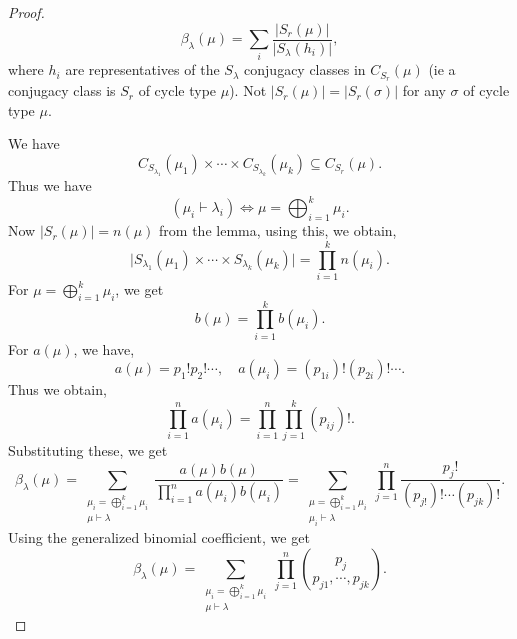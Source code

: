 \documentclass[10pt]{article}
\numberwithin{equation}{theorem}
\begin{document}
\begin{proof}
  \begin{equation*}
    \beta_{\lambda}(\mu) = \sum_{i} {\frac {\vert S_r(\mu)\vert} {\vert S_\lambda(h_i)
    \vert}},
  \end{equation*}
  where $h_i$ are representatives of the $S_\lambda$ conjugacy classes in $C_{S_r}(\mu)$ (ie a conjugacy class is $S_r$ of cycle type $\mu$). Not $\vert S_r(\mu)\vert = \vert S_r(\sigma)\vert $ for any $\sigma $ of cycle type $\mu$.
  \par We have
  \begin{equation*}
    C_{S_{\lambda_1}}(\mu_1)\times \cdots\times C_{S_{\lambda_k}}(\mu_k)\subseteq C_{S_r}(\mu).
  \end{equation*}
  Thus we have 
  \begin{equation*}
    (\mu_i\vdash \lambda_i)\Leftrightarrow \mu = \bigoplus_{i=1}^k \mu_i. 
  \end{equation*}
  Now $\vert S_r(\mu)\vert = n(\mu)$ from the lemma, using this, we obtain,
  \begin{equation*}
    \vert S_{\lambda_1}(\mu_1)\times \cdots\times S_{\lambda_k}(\mu_k)\vert  = \prod_{i=1}^k n(\mu_i).
  \end{equation*}
  For $\mu = \bigoplus_{i=1}^k\mu_i$, we get 
  \begin{equation*}
    b(\mu) = \prod_{i=1}^k b(\mu_i).
  \end{equation*}
  For $a(\mu)$, we have,
  \begin{equation*}
    a(\mu) = p_1!p_2!\cdots, \quad a(\mu_i) = (p_{1i})!(p_{2i})!\cdots.
  \end{equation*}
  Thus we obtain,
  \begin{equation*}
    \prod_{i=1}^n a(\mu_i) = \prod_{i=1}^n\prod_{j=1}^k (p_{ij})!.
  \end{equation*}
  Substituting these, we get 
  \begin{equation*}
    \beta_\lambda(\mu) = \sum_{\substack{\mu_i=\bigoplus_{i=1}^k \mu_i\\ \mu\vdash \lambda}} {\frac {a(\mu)b(\mu)} {\prod_{i=1}^na(\mu_i)b(\mu_i)}} = \sum_{\substack{\mu = \bigoplus_{i=1}^k \mu_i\\ \mu_i\vdash \lambda}}\prod_{j=1}^n {\frac {p_j!} {(p_{j!})!\cdots (p_{jk})!}}.
  \end{equation*}
  Using the generalized binomial coefficient, we get
  \begin{equation*}
    \beta_\lambda(\mu) = \sum_{\substack{\mu_i=\bigoplus_{i=1}^k \mu_i\\ \mu\vdash \lambda}} \prod_{j=1}^n {p_j \choose p_{j1},\cdots, p_{jk}}.
  \end{equation*}
\end{proof}
\end{document}
